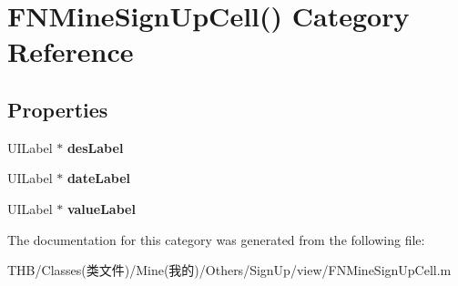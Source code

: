 \hypertarget{category_f_n_mine_sign_up_cell_07_08}{}\section{F\+N\+Mine\+Sign\+Up\+Cell() Category Reference}
\label{category_f_n_mine_sign_up_cell_07_08}
\subsection*{Properties}
\begin{DoxyCompactItemize}
\item 
\mbox{\label{category_f_n_mine_sign_up_cell_07_08_a29f695421309c9013794e6f493458841}} 
U\+I\+Label $\ast$ {\bfseries des\+Label}
\item 
\mbox{\label{category_f_n_mine_sign_up_cell_07_08_a14e61d48a45e37d7305c363fa175ab8b}} 
U\+I\+Label $\ast$ {\bfseries date\+Label}
\item 
\mbox{\label{category_f_n_mine_sign_up_cell_07_08_ae231e6e9abbbd3f663b72c67155836a2}} 
U\+I\+Label $\ast$ {\bfseries value\+Label}
\end{DoxyCompactItemize}


The documentation for this category was generated from the following file\+:\begin{DoxyCompactItemize}
\item 
T\+H\+B/\+Classes(类文件)/\+Mine(我的)/\+Others/\+Sign\+Up/view/F\+N\+Mine\+Sign\+Up\+Cell.\+m\end{DoxyCompactItemize}
